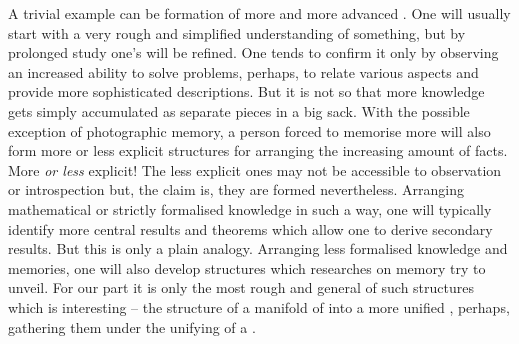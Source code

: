 

\pa A trivial example can be formation of more and more advanced
. One will usually start with a very rough and simplified
understanding of something, but by prolonged study one's  will be
refined.  One tends to confirm it only by observing an increased ability to
solve  problems, perhaps, to relate various aspects and provide more
sophisticated  descriptions.  But it is not so that more knowledge
gets simply accumulated as separate pieces in a big sack.  With the possible
exception of photographic memory, a person forced to memorise more will also
form more or less explicit structures for arranging the increasing amount of
facts.  More {\em or less} explicit!  The less explicit ones may not be
accessible to observation or introspection but, the claim is, they are formed
nevertheless.  Arranging mathematical or strictly formalised knowledge in such a
way, one will typically identify more central results and theorems which allow
one to derive secondary results.  But this is only a plain  analogy.
Arranging less formalised knowledge and memories, one will also develop
structures which researches on memory try to unveil.  For our part it is only
the most rough and general of such structures which is interesting -- the
structure of  a manifold of  into a more
unified \nexus, perhaps, gathering them under the unifying  of a
.

